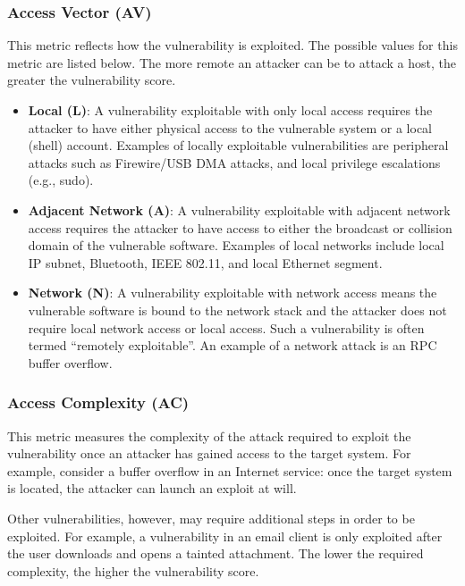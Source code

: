   \subsubsection{Access Vector (AV)}\label{access-vector-av}

  This metric reflects how the vulnerability is exploited. The possible
  values for this metric are listed below. The more remote an
  attacker can be to attack a host, the greater the vulnerability score.

  \begin{itemize}
  \tightlist
  \item
    \textbf{Local (L)}: A vulnerability exploitable with only local access
    requires the attacker to have either physical access to the vulnerable
    system or a local (shell) account. Examples of locally exploitable
    vulnerabilities are peripheral attacks such as Firewire/USB DMA
    attacks, and local privilege escalations (e.g., sudo).
  \item
    \textbf{Adjacent Network (A)}: A vulnerability exploitable with
    adjacent network access requires the attacker to have access to either
    the broadcast or collision domain of the vulnerable software. Examples
    of local networks include local IP subnet, Bluetooth, IEEE 802.11, and
    local Ethernet segment.
  \item
    \textbf{Network (N)}: A vulnerability exploitable with network access
    means the vulnerable software is bound to the network stack and the
    attacker does not require local network access or local access. Such a
    vulnerability is often termed ``remotely exploitable''. An example of
    a network attack is an RPC buffer overflow.
  \end{itemize}

  \subsubsection{Access Complexity (AC)}\label{access-complexity-ac}

  This metric measures the complexity of the attack required to exploit
  the vulnerability once an attacker has gained access to the target
  system. For example, consider a buffer overflow in an Internet service:
  once the target system is located, the attacker can launch an exploit at
  will.

  Other vulnerabilities, however, may require additional steps in order to
  be exploited. For example, a vulnerability in an email client is only
  exploited after the user downloads and opens a tainted attachment. The
  lower the required complexity, the higher the vulnerability score.

